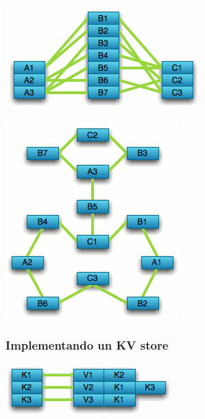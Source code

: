 \begin{frame}
\center
\includegraphics[width=0.9\linewidth,height=0.9\textheight,keepaspectratio]{bdog-1}
\end{frame}
\begin{frame}
\center
\includegraphics[width=0.9\linewidth,height=0.9\textheight,keepaspectratio]{bdog-2}
\end{frame}

\begin{frame}
\frametitle{Implementando un KV store}
 \center
 \includegraphics[width=0.9\linewidth,height=0.9\textheight,keepaspectratio]{bdog-3}
\end{frame}

